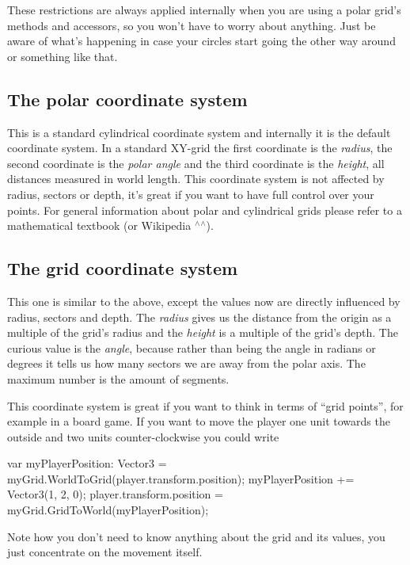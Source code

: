 These restrictions are always applied internally when you are using a polar grid’s methods and accessors, so you won’t have to worry about anything. Just be aware of what’s happening in case your circles start going the other way around or something like that.

\subsection*{The polar coordinate system }

This is a standard cylindrical coordinate system and internally it is the default coordinate system. In a standard X\+Y-\/grid the first coordinate is the {\itshape radius}, the second coordinate is the {\itshape polar angle} and the third coordinate is the {\itshape height}, all distances measured in world length. This coordinate system is not affected by {\ttfamily radius}, {\ttfamily sectors} or {\ttfamily depth}, it’s great if you want to have full control over your points. For general information about polar and cylindrical grids please refer to a mathematical textbook (or Wikipedia $^\wedge$$^\wedge$).

\subsection*{The grid coordinate system }

This one is similar to the above, except the values now are directly influenced by {\ttfamily radius}, {\ttfamily sectors} and {\ttfamily depth}. The {\itshape radius} gives us the distance from the origin as a multiple of the grid’s {\ttfamily radius} and the {\itshape height} is a multiple of the grid’s {\ttfamily depth}. The curious value is the {\itshape angle}, because rather than being the angle in radians or degrees it tells us how many sectors we are away from the polar axis. The maximum number is the amount of segments.

This coordinate system is great if you want to think in terms of “grid points”, for example in a board game. If you want to move the player one unit towards the outside and two units counter-\/clockwise you could write 
\begin{DoxyCode}
var myPlayerPosition: Vector3 = myGrid.WorldToGrid(player.transform.position);
myPlayerPosition += Vector3(1, 2, 0);
player.transform.position = myGrid.GridToWorld(myPlayerPosition);
\end{DoxyCode}
 Note how you don’t need to know anything about the grid and its values, you just concentrate on the movement itself.



